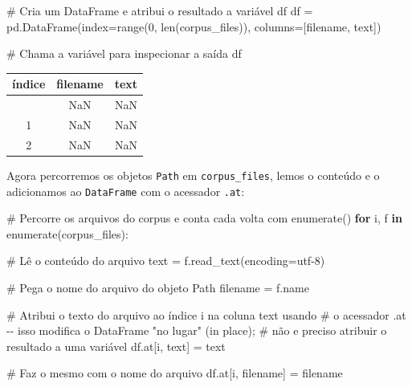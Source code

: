\documentclass[
  brazilian,
  11pt,
]{article}
\newenvironment{Shaded}{\begin{snugshade}}{\end{snugshade}}
\newcommand{\BuiltInTok}[1]{\textcolor[rgb]{0.50,0.55,0.55}{#1}}
\newcommand{\CommentTok}[1]{\textcolor[rgb]{0.48,0.49,0.49}{#1}}
\newcommand{\ControlFlowTok}[1]{\textcolor[rgb]{0.99,0.74,0.29}{\textbf{#1}}}
\newcommand{\DecValTok}[1]{\textcolor[rgb]{0.96,0.45,0.00}{#1}}
\newcommand{\KeywordTok}[1]{\textcolor[rgb]{0.81,0.81,0.76}{\textbf{#1}}}
\newcommand{\NormalTok}[1]{\textcolor[rgb]{0.81,0.81,0.76}{#1}}
\newcommand{\OperatorTok}[1]{\textcolor[rgb]{0.81,0.81,0.76}{#1}}
\newcommand{\StringTok}[1]{\textcolor[rgb]{0.96,0.31,0.31}{#1}}
\newcounter{none} %
\let\oldtexttt\texttt
\renewcommand{\texttt}[1]{{\color{inlink}\oldtexttt{#1}}}
\begin{document}
\begin{Shaded}
\begin{Highlighting}[]
\CommentTok{\# Cria um DataFrame e atribui o resultado a variável \textquotesingle{}df\textquotesingle{}}
\NormalTok{df }\OperatorTok{=}\NormalTok{ pd.DataFrame(index}\OperatorTok{=}\BuiltInTok{range}\NormalTok{(}\DecValTok{0}\NormalTok{, }\BuiltInTok{len}\NormalTok{(corpus\_files)), columns}\OperatorTok{=}\NormalTok{[}\StringTok{\textquotesingle{}filename\textquotesingle{}}\NormalTok{, }\StringTok{\textquotesingle{}text\textquotesingle{}}\NormalTok{])}

\CommentTok{\# Chama a variável para inspecionar a saída}
\NormalTok{df}
\end{Highlighting}
\end{Shaded}

{\def\LTcaptype{none} %
\begin{longtable}[]{@{}ccc@{}}
\toprule\noalign{}
índice & filename & text \\
\midrule\noalign{}
\endhead
\bottomrule\noalign{}
\endlastfoot
0 & NaN & NaN \\
1 & NaN & NaN \\
2 & NaN & NaN \\
\end{longtable}
}

Agora percorremos os objetos \texttt{Path} em \texttt{corpus\_files},
lemos o conteúdo e o adicionamos ao \texttt{DataFrame} com o acessador
\texttt{.at}:

\begin{Shaded}
\begin{Highlighting}[]
\CommentTok{\# Percorre os arquivos do corpus e conta cada volta com enumerate()}
\ControlFlowTok{for}\NormalTok{ i, f }\KeywordTok{in} \BuiltInTok{enumerate}\NormalTok{(corpus\_files):}

    \CommentTok{\# Lê o conteúdo do arquivo}
\NormalTok{    text }\OperatorTok{=}\NormalTok{ f.read\_text(encoding}\OperatorTok{=}\StringTok{\textquotesingle{}utf{-}8\textquotesingle{}}\NormalTok{)}

    \CommentTok{\# Pega o nome do arquivo do objeto Path}
\NormalTok{    filename }\OperatorTok{=}\NormalTok{ f.name}

    \CommentTok{\# Atribui o texto do arquivo ao índice \textquotesingle{}i\textquotesingle{} na coluna \textquotesingle{}text\textquotesingle{} usando}
    \CommentTok{\# o acessador .at {-}{-} isso modifica o DataFrame "no lugar" (in place);}
    \CommentTok{\# não e preciso atribuir o resultado a uma variável}
\NormalTok{    df.at[i, }\StringTok{\textquotesingle{}text\textquotesingle{}}\NormalTok{] }\OperatorTok{=}\NormalTok{ text}

    \CommentTok{\# Faz o mesmo com o nome do arquivo}
\NormalTok{    df.at[i, }\StringTok{\textquotesingle{}filename\textquotesingle{}}\NormalTok{] }\OperatorTok{=}\NormalTok{ filename}
\end{Highlighting}
\end{Shaded}
\end{document}
